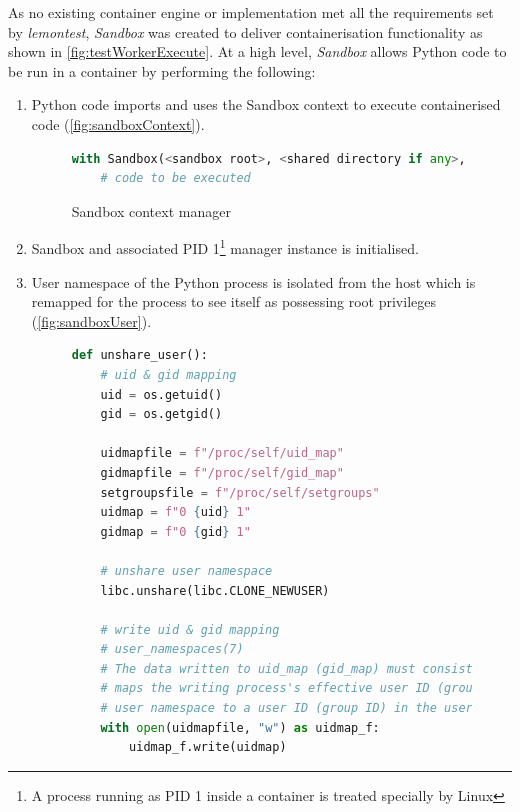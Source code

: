 \documentclass[hidelinks]{report}
\begin{document}
As no existing container engine or implementation met all the requirements set by \textit{lemontest}, \textit{Sandbox} was created to deliver containerisation functionality as shown in \autoref{fig:testWorkerExecute}. At a high level, \textit{Sandbox} allows Python code to be run in a container by performing the following:
\begin{enumerate}
	\item Python code imports and uses the Sandbox context to execute containerised code (\autoref{fig:sandboxContext}).
	\begin{figure}[h]
		\centering
		\begin{lstlisting}[language=python, breaklines=true, linewidth=\linewidth, tabsize=4]
with Sandbox(<sandbox root>, <shared directory if any>, <sandbox parameters>) as sb:
	# code to be executed
		\end{lstlisting}
		\caption{Sandbox context manager}
		\label{fig:sandboxContext}
	\end{figure}
	\item Sandbox and associated PID 1\footnote{A process running as PID 1 inside a container is treated specially by Linux} manager instance is initialised.
	\item User namespace of the Python process is isolated from the host which is remapped for the process to see itself as possessing root privileges (\autoref{fig:sandboxUser}).
	\begin{figure}[h]
		\centering
		\begin{lstlisting}[language=python, breaklines=true, linewidth=\linewidth, tabsize=4]
def unshare_user():
    # uid & gid mapping
    uid = os.getuid()
    gid = os.getgid()

    uidmapfile = f"/proc/self/uid_map"
    gidmapfile = f"/proc/self/gid_map"
    setgroupsfile = f"/proc/self/setgroups"
    uidmap = f"0 {uid} 1"
    gidmap = f"0 {gid} 1"

    # unshare user namespace
    libc.unshare(libc.CLONE_NEWUSER)

    # write uid & gid mapping
    # user_namespaces(7)
    # The data written to uid_map (gid_map) must consist of a single line that
    # maps the writing process's effective user ID (group ID) in the parent
    # user namespace to a user ID (group ID) in the user namespace.
    with open(uidmapfile, "w") as uidmap_f:
        uidmap_f.write(uidmap)


\end{lstlisting}
\end{figure}
\end{enumerate}
\end{document}
